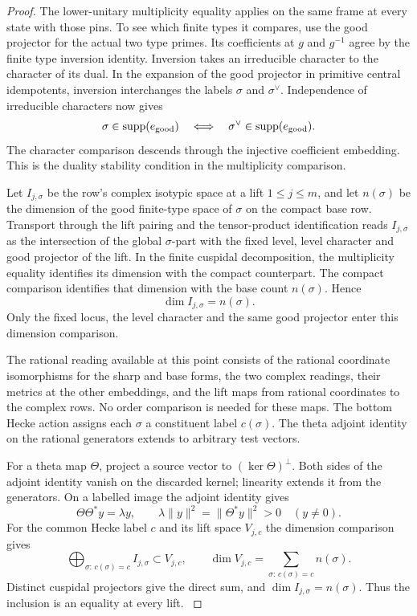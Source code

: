 \begin{proof}
The lower-unitary multiplicity equality applies on the
same frame at every state with those pins. To see which
finite types it compares, use the good projector for the
actual two type primes. Its coefficients at \(g\) and
\(g^{-1}\) agree by the finite type inversion identity.
Inversion takes an irreducible character to the character
of its dual. In the expansion of the good projector in primitive central idempotents, inversion interchanges the labels \(\sigma\) and \(\sigma^\vee\). Independence of irreducible characters now gives
\[
 \sigma\in\operatorname{supp}(e_{\rm good})\quad\Longleftrightarrow\quad\sigma^\vee\in\operatorname{supp}(e_{\rm good}).
\] The
character comparison descends through the injective
coefficient embedding. This is the duality stability
condition in the multiplicity comparison.
\label{cor:automorphic-realization-23}

Let \(I_{j,\sigma}\) be the row's complex isotypic space
at a lift \(1\le j\le m\), and let \(n(\sigma)\) be
the dimension of the good finite-type space of \(\sigma\)
on the compact base row. Transport through the lift
pairing and the tensor-product identification reads
\(I_{j,\sigma}\) as the intersection of the global
\(\sigma\)-part with the fixed level, level character and
good projector of the lift. In the finite cuspidal
decomposition, the multiplicity equality identifies its
dimension with the compact counterpart. The compact
comparison identifies that dimension with the base count
\(n(\sigma)\). Hence
\[
                      \dim I_{j,\sigma}=n(\sigma).
\]
Only the fixed locus, the level character and the same
good projector enter this dimension comparison.
\label{cor:automorphic-realization-24}

The rational reading available at this point consists of
the rational coordinate isomorphisms for the sharp and
base forms, the two complex readings, their metrics at
the other embeddings, and the lift maps from rational
coordinates to the complex rows. No order comparison
is needed for these maps. The bottom Hecke action assigns
each \(\sigma\) a constituent label \(c(\sigma)\).
The theta adjoint identity on the rational generators
extends to arbitrary test vectors.

For a theta map
\(\Theta\), project a source vector to
\((\ker\Theta)^\perp\). Both sides of the adjoint identity vanish
on the discarded kernel; linearity extends it from the generators.
On a labelled image the adjoint identity gives
\[
 \Theta\Theta^*y=\lambda y,\qquad
 \lambda\|y\|^2=\|\Theta^*y\|^2>0\quad(y\ne0).
\] For the common Hecke label \(c\)
and its lift space \(V_{j,c}\) the dimension comparison gives
\[
 \bigoplus_{\sigma:\,c(\sigma)=c}I_{j,\sigma}\subset V_{j,c},
 \qquad \dim V_{j,c}=\sum_{\sigma:\,c(\sigma)=c}n(\sigma).
\]
Distinct cuspidal projectors give the direct sum, and
\(\dim I_{j,\sigma}=n(\sigma)\). Thus the inclusion is an equality
at every lift. \label{cor:automorphic-realization-25}


\end{proof}
